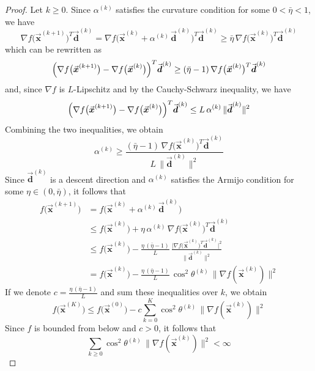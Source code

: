 \documentclass[9pt, headings=standardclasses, parskip=half]{scrartcl}
\newcommand{\vect}[1]{\vec{\boldsymbol{#1}}}
\begin{document}
\begin{proof}
Let \(k \ge 0\). Since \(\alpha^{(k)}\) satisfies the curvature condition for some \(0 < \bar{\eta} < 1\), we have
\[
\nabla f\bigl(\vect{x}^{(k+1)}\bigr)^T \vect{d}^{(k)} = \nabla f\bigl(\vect{x}^{(k)} + \alpha^{(k)}\, \vect{d}^{(k)}\bigr)^T \vect{d}^{(k)} \ge \bar{\eta}\, \nabla f\bigl(\vect{x}^{(k)}\bigr)^T \vect{d}^{(k)} %
\]
which can be rewritten as
\[
\Bigl(\nabla f\bigl(\vect{x}^{(k+1)}\bigr)-\nabla f\bigl(\vect{x}^{(k)}\bigr)\Bigr)^T \vect{d}^{(k)} \ge (\bar{\eta} - 1)\, \nabla f\bigl(\vect{x}^{(k)}\bigr)^T \vect{d}^{(k)} %
\]
and, since \(\nabla f\) is \(L\)-Lipschitz and by the Cauchy-Schwarz inequality, we have
\[
\Bigl(\nabla f\bigl(\vect{x}^{(k+1)}\bigr)-\nabla f\bigl(\vect{x}^{(k)}\bigr)\Bigr)^T \vect{d}^{(k)} \le L\, \alpha^{(k)}\, \|\vect{d}^{(k)}\|^2 %
\]
Combining the two inequalities, we obtain
\[
\alpha^{(k)} \ge \frac{(\bar{\eta}-1)\, \nabla f\bigl(\vect{x}^{(k)}\bigr)^T \vect{d}^{(k)}}{L\, \|\vect{d}^{(k)}\|^2} %
\]
Since \(\vect{d}^{(k)}\) is a descent direction and \(\alpha^{(k)}\) satisfies the Armijo condition for some \(\eta \in (0,\bar{\eta})\), it follows that
\[
\begin{aligned}
f\bigl(\vect{x}^{(k+1)}\bigr) &= f\bigl(\vect{x}^{(k)} + \alpha^{(k)}\, \vect{d}^{(k)}\bigr) \\
&\le f\bigl(\vect{x}^{(k)}\bigr) + \eta\, \alpha^{(k)}\, \nabla f\bigl(\vect{x}^{(k)}\bigr)^T \vect{d}^{(k)} \\
&\le f\bigl(\vect{x}^{(k)}\bigr) - \frac{\eta\, (\bar{\eta}-1)}{L}\, \frac{\bigl|\nabla f\bigl(\vect{x}^{(k)}\bigr)^T \vect{d}^{(k)}\bigr|^2}{\|\vect{d}^{(k)}\|^2} \\
&= f\bigl(\vect{x}^{(k)}\bigr) - \frac{\eta\, (\bar{\eta}-1)}{L}\, \cos^2\theta^{(k)}\, \|\nabla f(\vect{x}^{(k)})\|^2 %
\end{aligned}
\]
If we denote \(c = \frac{\eta\, (\bar{\eta}-1)}{L}\) and sum these inequalities over \(k\), we obtain
\[
f\bigl(\vect{x}^{(K)}\bigr) \le f\bigl(\vect{x}^{(0)}\bigr) - c \sum_{k=0}^{K} \cos^2\theta^{(k)}\, \|\nabla f(\vect{x}^{(k)})\|^2 %
\]
Since \(f\) is bounded from below and \(c > 0\), it follows that
\[
\sum_{k \geq 0} \cos^2\theta^{(k)}\, \|\nabla f(\vect{x}^{(k)})\|^2 < \infty %
\]
\end{proof}
\end{document}
